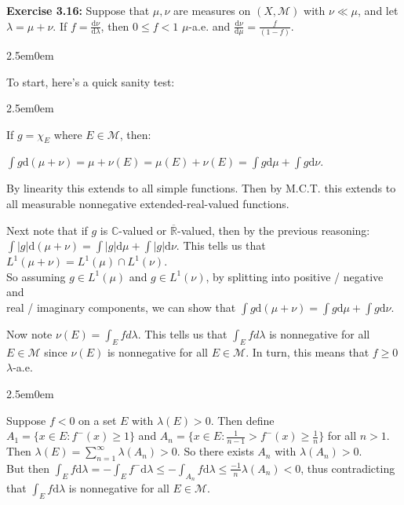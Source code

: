 \documentclass{book}
\newcommand{\exTwoP}{%
   \color{RedViolet}%
   \fontsize{13}{15}\selectfont%
}
\newcommand{\exPPP}{%
   \color{VioletRed}%
   \fontsize{12}{14}\selectfont%
}
\newenvironment{myIndent}{%
   \begin{adjustwidth}{2.5em}{0em}%
}{%
   \end{adjustwidth}%
}
\newcommand{\blab}[1]{\textbf{#1}}
\newcommand{\df}{\mathrm{d}}
\newcommand{\retTwo}{\hfill\bigbreak}
\begin{document}
\blab{Exercise 3.16:} Suppose that $\mu, \nu$ are measures on $(X, \mathcal{M})$ with $\nu \ll \mu$, and let $\lambda = \mu + \nu$. If $f = \frac{\df \nu}{ \df \lambda}$, then $0 \leq f < 1$ $\mu$-a.e. and $\frac{\df \nu}{ \df \mu} = \frac{f}{ (1 - f)}$.\\ [-8pt]

\begin{myIndent}\exTwoP
	To start, here's a quick sanity test:
	\begin{myIndent}\exPPP
		If $g = \chi_E$ where $E \in \mathcal{M}$, then:
		
		{\centering $\int g \df(\mu + \nu) = \mu + \nu(E) = \mu(E)  + \nu(E) = \int g \df \mu + \int g \df \nu$.\retTwo\par}

		By linearity this extends to all simple functions. Then by M.C.T. this extends to all measurable nonnegative extended-real-valued functions.\newpage

		Next note that if $g$ is $\mathbb{C}$-valued or $\overline{\mathbb{R}}$-valued, then by the previous reasoning:\\ $\int |g|\df(\mu + \nu)= \int |g|\df\mu + \int |g|\df\nu$. This tells us that $L^1(\mu + \nu) = L^1(\mu) \cap L^1(\nu)$.\\ So assuming $g \in L^1(\mu)$ and $g \in L^1(\nu)$, by splitting into positive / negative and\\ real / imaginary components, we can show that $\int g \df(\mu + \nu) = \int g \df\mu + \int g \df \nu$.\retTwo
	\end{myIndent}

	Now note $\nu(E) = \int_E f d\lambda$. This tells us that $\int_E f d\lambda$ is nonnegative for all $E \in \mathcal{M}$ since $\nu(E)$ is nonnegative for all $E \in \mathcal{M}$. In turn, this means that $f \geq 0$ $\lambda$-a.e.
	
	\begin{myIndent}\exPPP
		Suppose $f < 0$ on a set $E$ with $\lambda(E) > 0$. Then define $A_1 = \{x \in E : f^-(x) \geq 1\}$ and $A_n = \{x \in E : \frac{1}{n-1} > f^-(x) \geq \frac{1}{n}\}$ for all $n > 1$.\\
		
		Then $\lambda(E) = \sum\limits_{n = 1}^\infty \lambda(A_n) > 0$. So there exists $A_n$ with $\lambda(A_n) > 0$.\\
		
		But then $\int_E f \df\lambda = -\int_E f^- \df\lambda \leq -\int_{A_n} f\df\lambda \leq \frac{-1}{n} \lambda(A_n) < 0$, thus contradicting that $\int_E f\df\lambda$ is nonnegative for all $E \in \mathcal{M}$.\retTwo
	\end{myIndent}


\end{myIndent}
\end{document}
